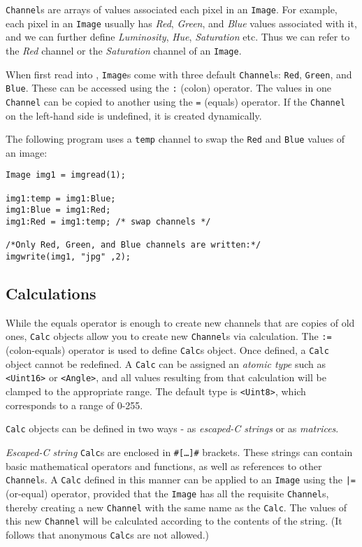 \texttt{Channel}s are arrays of values associated each pixel in an \texttt{Image}.
For example, each pixel in an \texttt{Image} usually has \emph{Red}, \emph{Green}, and \emph{Blue} values
associated with it, and we can further define \emph{Luminosity}, \emph{Hue}, \emph{Saturation} etc.
Thus we can refer to the \emph{Red} channel or the \emph{Saturation} channel of an \texttt{Image}.

When first read into \sys{}, \texttt{Image}s come with three default \texttt{Channel}s:
\texttt{Red}, \texttt{Green}, and \texttt{Blue}. These can be accessed using the \texttt{:} (colon) operator.
The values in one \texttt{Channel} can be copied to another using the \texttt{=} (equals) operator.
If the \texttt{Channel} on the left-hand side is undefined, it is created dynamically.

The following program uses a \texttt{temp} channel to swap the \texttt{Red} and \texttt{Blue} values of an image:

\begin{lstlisting}[language=CLAM,escapechar=\%]
Image img1 = imgread(1);

img1:temp = img1:Blue;
img1:Blue = img1:Red;
img1:Red = img1:temp; /* swap channels */

/*Only Red, Green, and Blue channels are written:*/
imgwrite(img1, "jpg" ,2);
\end{lstlisting}

\subsection{Calculations}

While the equals operator is enough to create new channels that are copies of old ones,
\texttt{Calc} objects allow you to create new \texttt{Channel}s via calculation.
The \texttt{:=} (colon-equals) operator is used to define \texttt{Calc}s object.
Once defined, a \texttt{Calc} object cannot be redefined.
A \texttt{Calc} can be assigned an \emph{atomic type} such as \texttt{<Uint16>} or \texttt{<Angle>},
and all values resulting from that calculation will be clamped to the appropriate range.
The default type is \texttt{<Uint8>}, which corresponds to a range of 0-255.
  
\texttt{Calc} objects can be defined in two ways - as \emph{escaped-C strings} or as \emph{matrices}.

\emph{Escaped-C string} \texttt{Calc}s are enclosed in \texttt{\#[\ldots]\#} brackets. These strings can contain basic mathematical
operators and functions, as well as references to other \texttt{Channel}s. A \texttt{Calc}
defined in this manner can be applied to an \texttt{Image} using the \texttt{|=} (or-equal) operator,
provided that the \texttt{Image} has all the requisite \texttt{Channel}s,
thereby creating a new \texttt{Channel} with the same name as the \texttt{Calc}. The values of this new
\texttt{Channel} will be calculated according
to the contents of the string. (It follows that anonymous \texttt{Calc}s are not allowed.)\\

